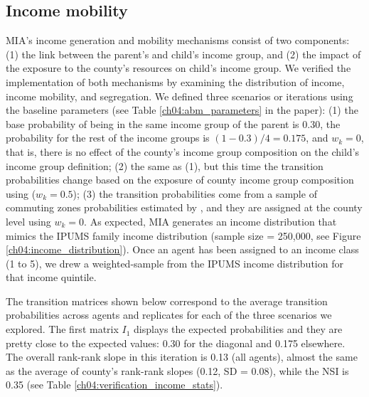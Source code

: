 
\subsection{Income mobility}

MIA's income generation and mobility mechanisms consist of two components: (1) the link between the parent's and child's income group, and (2) the impact of the exposure to the county's resources on child's income group. We verified the implementation of both mechanisms by examining the distribution of income, income mobility, and segregation. We defined three scenarios or iterations using the baseline parameters (see Table \ref{ch04:abm_parameters} in the paper): (1) the base probability of being in the same income group of the parent is 0.30, the probability for the rest of the income groups is $(1 - 0.3)/4 = 0.175$, and $w_k = 0$, that is, there is no effect of the county's income group composition on the child's income group definition; (2) the same as (1), but this time the transition probabilities change based on the exposure of county income group composition using ($w_k = 0.5$); (3) the transition probabilities come from a sample of commuting zones probabilities estimated by \citet{chetty2014}, and they are assigned at the county level using $w_k = 0$. As expected, MIA generates an income distribution that mimics the IPUMS family income distribution (sample size = 250,000, see Figure \ref{ch04:income_distribution}). Once an agent has been assigned to an income class (1 to 5), we drew a weighted-sample from the IPUMS income distribution for that income quintile. 

\vspace{5mm}


The transition matrices shown below correspond to the average transition probabilities across agents and replicates for each of the three scenarios we explored. The first matrix $I_1$ displays the expected probabilities and they are pretty close to the expected values: 0.30 for the diagonal and 0.175 elsewhere. The overall rank-rank slope in this iteration is 0.13 (all agents), almost the same as the average of county's rank-rank slopes (0.12, SD = 0.08), while the NSI is 0.35 (see Table \ref{ch04:verification_income_stats}). 

